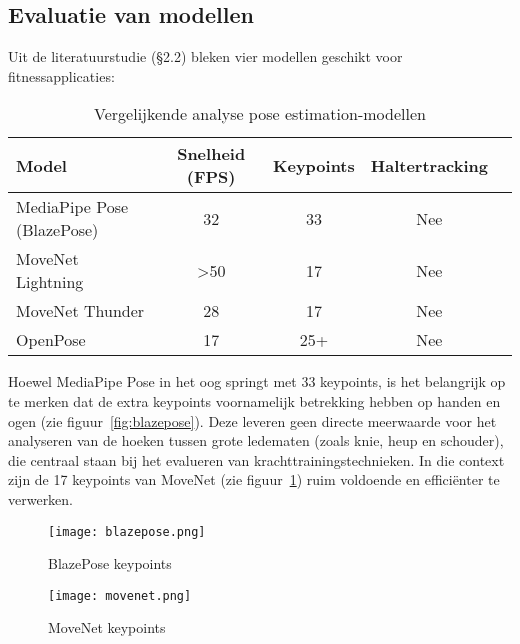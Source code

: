 \subsection{Evaluatie van modellen}

Uit de literatuurstudie (§2.2) bleken vier modellen geschikt voor fitnessapplicaties:

\begin{table}[h]
    \centering
    \caption{Vergelijkende analyse pose estimation-modellen}
    \begin{tabular}{lcccl}
    \toprule
    Model & Snelheid (FPS) & Keypoints & Haltertracking \\
    \midrule
    MediaPipe Pose (BlazePose) & 32 & 33 & Nee \\
    MoveNet Lightning & >50 & 17 & Nee \\
    MoveNet Thunder & 28 & 17 & Nee \\
    OpenPose & 17 & 25+ & Nee \\ 
    \bottomrule
    \end{tabular}
    \label{tab:pose_models} 
    \end{table}

Hoewel MediaPipe Pose in het oog springt met 33 keypoints, is het belangrijk op te merken dat de extra keypoints voornamelijk betrekking hebben op handen en ogen (zie figuur~\ref{fig:blazepose}). 
Deze leveren geen directe meerwaarde voor het analyseren van de hoeken tussen grote ledematen (zoals knie, heup en schouder), die centraal staan bij het evalueren van krachttrainingstechnieken. 
In die context zijn de 17 keypoints van MoveNet (zie figuur~\ref{fig:movenet}) ruim voldoende en efficiënter te verwerken.

\begin{figure}[h]
  \centering
  \begin{minipage}{0.45\textwidth}
      \centering
      \texttt{[image: blazepose.png]}
      \caption[BlazePose keypoints]{\label{fig:blazepose}BlazePose keypoints \autocite{RoggioEtAl2024}}
  \end{minipage}
  \hfill %
  \begin{minipage}{0.45\textwidth}
      \centering
      \texttt{[image: movenet.png]}
      \caption[MoveNet keypoints]{\label{fig:movenet}MoveNet keypoints \autocite{RoggioEtAl2024}}
  \end{minipage}
\end{figure}  

